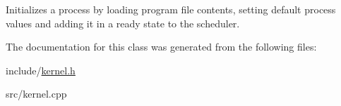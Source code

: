 \-Initializes a process by loading program file contents, setting default process values and adding it in a ready state to the scheduler. 

\-The documentation for this class was generated from the following files\-:\begin{DoxyCompactItemize}
\item 
include/\hyperlink{kernel_8h}{kernel.\-h}\item 
src/kernel.\-cpp\end{DoxyCompactItemize}
